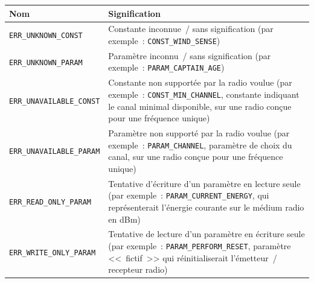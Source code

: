 \begin{table}[!hbt]
\centering

\begin{tabular}{|l|p{9cm}|}
\hline
\textbf{Nom} & \textbf{Signification} \\
\hline
\texttt{ERR\_UNKNOWN\_CONST}     & Constante inconnue~/ sans signification
                                   (par exemple~:
                                    \texttt{CONST\_WIND\_SENSE}) \\
\hline
\texttt{ERR\_UNKNOWN\_PARAM}     & Paramètre inconnu~/ sans signification
                                   (par exemple~:
                                    \texttt{PARAM\_CAPTAIN\_AGE}) \\
\hline
\texttt{ERR\_UNAVAILABLE\_CONST} & Constante non supportée par la radio
                                   voulue (par exemple~:
                                   \texttt{CONST\_MIN\_CHANNEL},
                                   constante indiquant le canal minimal
                                   disponible, sur une radio conçue
                                   pour une fréquence unique) \\
\hline
\texttt{ERR\_UNAVAILABLE\_PARAM} & Paramètre non supporté par la radio
                                   voulue (par exemple~:
                                   \texttt{PARAM\_CHANNEL}, paramètre
                                   de choix du canal, sur une radio
                                   conçue pour une fréquence unique) \\
\hline
\texttt{ERR\_READ\_ONLY\_PARAM}  & Tentative d'écriture d'un paramètre
                                   en lecture seule (par exemple~:
                                   \texttt{PARAM\_CURRENT\_ENERGY}, qui
                                   représenterait l'énergie courante sur
                                   le médium radio en dBm) \\
\hline
\texttt{ERR\_WRITE\_ONLY\_PARAM} & Tentative de lecture d'un paramètre
                                   en écriture seule (par exemple~:
                                   \texttt{PARAM\_PERFORM\_RESET}, paramètre
                                   <<~fictif~>> qui réinitialiserait
                                   l'émetteur~/ recepteur radio) \\
\hline
\end{tabular}

\label{TblAPICapErr}
\end{table}


